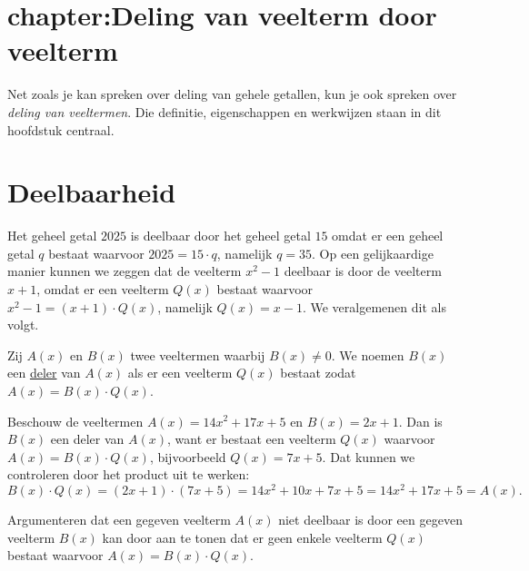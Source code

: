 \documentclass{ximera}
\begin{document}
\author{Koen de Naeghel - Wiskunde Op Maat}





\section{chapter:Deling van veelterm door veelterm}\label{hoofdstuk:2}

Net zoals je kan spreken over deling van gehele getallen, kun je ook spreken over {\em deling van veeltermen}. Die definitie, eigenschappen en werkwijzen staan in dit hoofdstuk centraal. 

\section{Deelbaarheid}

Het geheel getal $2025$ is deelbaar door het geheel getal $15$ omdat er een geheel getal $q$ bestaat waarvoor $2025 = 15\cdot q$, namelijk $q = 35$. Op een gelijkaardige manier kunnen we zeggen dat de veelterm $x^2-1$ deelbaar is door de veelterm $x+1$, omdat er een veelterm $Q(x)$ bestaat waarvoor $x^2-1 = (x+1)\cdot Q(x)$, namelijk $Q(x) = x-1$. We veralgemenen dit als volgt.

\begin{definition} 
Zij $A(x)$ en $B(x)$ twee veeltermen waarbij $B(x) \neq 0$. 
We noemen $B(x)$ een \underline{deler} van $A(x)$ als er een veelterm $Q(x)$ bestaat zodat $A(x) = B(x)\cdot Q(x)$.
\end{definition} 

\begin{example} 
Beschouw de veeltermen $A(x) = 14x^2+17x+5$ en $B(x) = 2x+1$. Dan is $B(x)$ een deler van $A(x)$, want er bestaat een veelterm $Q(x)$ waarvoor $A(x) = B(x) \cdot Q(x)$, bijvoorbeeld $Q(x) = 7x+5$. Dat kunnen we controleren door het product %
uit te werken:
\[
B(x) \cdot Q(x) = (2x+1) \cdot (7x+5) = 14x^2 + 10x + 7x + 5 = 14x^2 + 17x + 5 = A(x).
\]
\end{example} 

Argumenteren dat een gegeven veelterm $A(x)$ niet deelbaar is door een gegeven veelterm $B(x)$ kan door aan te tonen dat er geen enkele veelterm $Q(x)$ bestaat waarvoor $A(x) = B(x) \cdot Q(x)$. 
\end{document}
